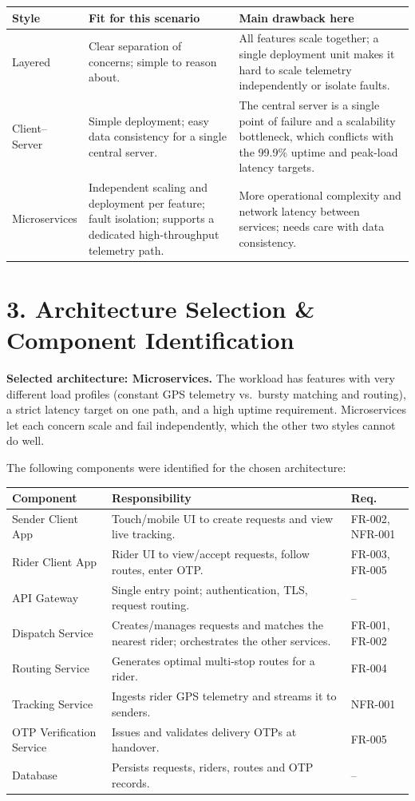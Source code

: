 \documentclass[11pt]{article}
\begin{document}
\begin{tabular}{|p{2.6cm}|p{5.0cm}|p{5.4cm}|}
\hline
\textbf{Style} & \textbf{Fit for this scenario} & \textbf{Main drawback here} \\
\hline
Layered & Clear separation of concerns; simple to reason about. & All features scale together; a single deployment unit makes it hard to scale telemetry independently or isolate faults. \\
\hline
Client--Server & Simple deployment; easy data consistency for a single central server. & The central server is a single point of failure and a scalability bottleneck, which conflicts with the 99.9\% uptime and peak-load latency targets. \\
\hline
Microservices & Independent scaling and deployment per feature; fault isolation; supports a dedicated high-throughput telemetry path. & More operational complexity and network latency between services; needs care with data consistency. \\
\hline
\end{tabular}

\section*{3. Architecture Selection \& Component Identification}

\textbf{Selected architecture: Microservices.} The workload has features with very different load profiles (constant GPS telemetry vs.\ bursty matching and routing), a strict latency target on one path, and a high uptime requirement. Microservices let each concern scale and fail independently, which the other two styles cannot do well.

The following components were identified for the chosen architecture:

\begin{tabular}{|p{4.3cm}|p{7.2cm}|p{1.6cm}|}
\hline
\textbf{Component} & \textbf{Responsibility} & \textbf{Req.} \\
\hline
Sender Client App & Touch/mobile UI to create requests and view live tracking. & FR-002, NFR-001 \\
\hline
Rider Client App & Rider UI to view/accept requests, follow routes, enter OTP. & FR-003, FR-005 \\
\hline
API Gateway & Single entry point; authentication, TLS, request routing. & -- \\
\hline
Dispatch Service & Creates/manages requests and matches the nearest rider; orchestrates the other services. & FR-001, FR-002 \\
\hline
Routing Service & Generates optimal multi-stop routes for a rider. & FR-004 \\
\hline
Tracking Service & Ingests rider GPS telemetry and streams it to senders. & NFR-001 \\
\hline
OTP Verification Service & Issues and validates delivery OTPs at handover. & FR-005 \\
\hline
Database & Persists requests, riders, routes and OTP records. & -- \\
\hline
\end{tabular}
\end{document}
